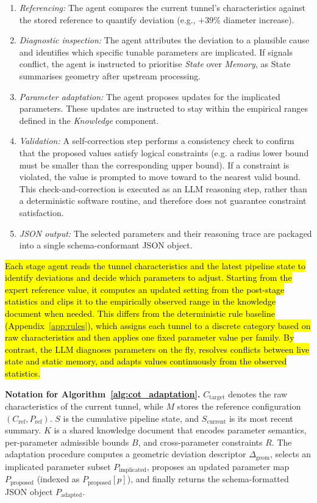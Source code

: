 \documentclass[a4paper,fleqn]{cas-dc}
\begin{document}
{\begin{enumerate}
    \item \emph{Referencing:} The agent compares the current tunnel's characteristics against the stored reference to quantify deviation (e.g., $+39\%$ diameter increase).
    \item \emph{Diagnostic inspection:} The agent attributes the deviation to a plausible cause and identifies which specific tunable parameters are implicated. If signals conflict, the agent is instructed to prioritise \emph{State} over \emph{Memory}, as State summarises geometry after upstream processing.
    \item \emph{Parameter adaptation:} The agent proposes updates for the implicated parameters. These updates are instructed to stay within the empirical ranges defined in the \emph{Knowledge} component.
    \item \emph{Validation:} A self-correction step performs a consistency check to confirm that the proposed values satisfy logical constraints (e.g. a radius lower bound must be smaller than the corresponding upper bound). If a constraint is violated, the value is prompted to move toward to the nearest valid bound. This check-and-correction is executed as an LLM reasoning step, rather than a deterministic software routine, and therefore does not guarantee constraint satisfaction.
    \item \emph{JSON output:} The selected parameters and their reasoning trace are packaged into a single schema-conformant JSON object.
\end{enumerate}

\hl{Each stage agent reads the tunnel characteristics and the latest pipeline state to identify deviations and decide which parameters to adjust. Starting from the expert reference value, it computes an updated setting from the post-stage statistics and clips it to the empirically observed range in the knowledge document when needed. This differs from the deterministic rule baseline (Appendix~\ref{app:rules}), which assigns each tunnel to a discrete category based on raw characteristics and then applies one fixed parameter value per family. By contrast, the LLM diagnoses parameters on the fly, resolves conflicts between live state and static memory, and adapts values continuously from the observed statistics.}

\noindent\textbf{Notation for Algorithm~\ref{alg:cot_adaptation}.} $C_{\text{target}}$ denotes the raw characteristics of the current tunnel, while $M$ stores the reference configuration $(C_{\text{ref}}, P_{\text{ref}})$. $S$ is the cumulative pipeline state, and $S_{\text{current}}$ is its most recent summary. $K$ is a shared knowledge document that encodes parameter semantics, per-parameter admissible bounds $B$, and cross-parameter constraints $R$. The adaptation procedure computes a geometric deviation descriptor $\Delta_{\text{geom}}$, selects an implicated parameter subset $P_{\text{implicated}}$, proposes an updated parameter map $P_{\text{proposed}}$ (indexed as $P_{\text{proposed}}[p]$), and finally returns the schema-formatted JSON object $P_{\text{adapted}}$.

}
\end{document}
